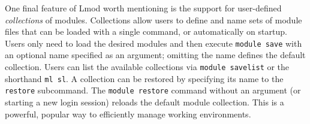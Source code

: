 One final feature of Lmod worth mentioning is the support for user-defined
\emph{collections} of modules. Collections allow users to define and name sets of
module files that can be loaded with a single command, or automatically on startup.
Users only need to load the desired modules and then execute
\texttt{\small module save} with an optional name specified as an argument;
omitting the name defines the default collection. Users can list the available
collections via \texttt{\small module savelist} or the shorthand
\texttt{\small ml sl}.  A collection can be restored by specifying its name to the
\texttt{\small restore} subcommand. The \texttt{\small module restore} command
without an argument (or starting a  new login session) reloads the default module
collection. This is a powerful, popular way to efficiently manage working
environments.



%
